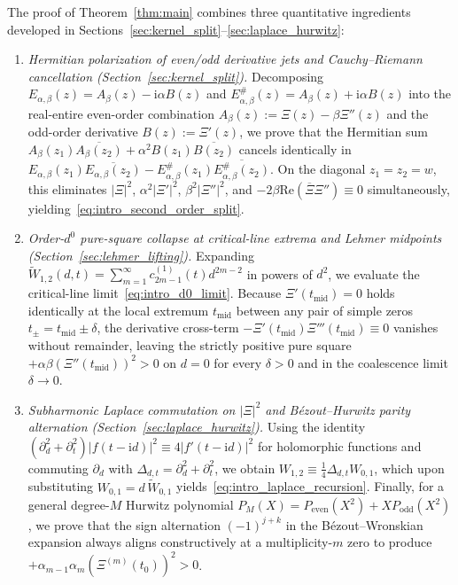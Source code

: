 \documentclass[11pt,reqno]{amsart}
\theoremstyle{definition}
\theoremstyle{remark}
\numberwithin{equation}{section}
\newcommand{\ii}{\mathrm{i}}
\newcommand{\Rea}{\mathrm{Re}}
\begin{document}
The proof of Theorem~\ref{thm:main} combines three quantitative ingredients developed in Sections~\ref{sec:kernel_split}--\ref{sec:laplace_hurwitz}:
\begin{enumerate}[label=\textup{(\arabic*)},leftmargin=2.2em]
\item \textit{Hermitian polarization of even/odd derivative jets and Cauchy--Riemann cancellation (Section~\ref{sec:kernel_split}).} Decomposing $E_{\alpha,\beta}(z) = A_\beta(z) - \ii\alpha B(z)$ and $E_{\alpha,\beta}^\#(z) = A_\beta(z) + \ii\alpha B(z)$ into the real-entire even-order combination $A_\beta(z) := \Xi(z) - \beta\Xi''(z)$ and the odd-order derivative $B(z) := \Xi'(z)$, we prove that the Hermitian sum $A_\beta(z_1)\overline{A_\beta(z_2)} + \alpha^2 B(z_1)\overline{B(z_2)}$ cancels identically in $E_{\alpha,\beta}(z_1)\overline{E_{\alpha,\beta}(z_2)} - E_{\alpha,\beta}^\#(z_1)\overline{E_{\alpha,\beta}^\#(z_2)}$. On the diagonal $z_1 = z_2 = w$, this eliminates $|\Xi|^2$, $\alpha^2|\Xi'|^2$, $\beta^2|\Xi''|^2$, and $-2\beta\Rea(\overline{\Xi}\Xi'') \equiv 0$ simultaneously, yielding~\eqref{eq:intro_second_order_split}.
\item \textit{Order-$d^0$ pure-square collapse at critical-line extrema and Lehmer midpoints (Section~\ref{sec:lehmer_lifting}).} Expanding $\widetilde{W}_{1,2}(d,t) = \sum_{m=1}^\infty c_{2m-1}^{(1)}(t)d^{2m-2}$ in powers of $d^2$, we evaluate the critical-line limit~\eqref{eq:intro_d0_limit}. Because $\Xi'(t_{\mathrm{mid}}) = 0$ holds identically at the local extremum $t_{\mathrm{mid}}$ between any pair of simple zeros $t_\pm = t_{\mathrm{mid}} \pm \delta$, the derivative cross-term $-\Xi'(t_{\mathrm{mid}})\Xi'''(t_{\mathrm{mid}}) \equiv 0$ vanishes without remainder, leaving the strictly positive pure square $+\alpha\beta(\Xi''(t_{\mathrm{mid}}))^2 > 0$ on $d = 0$ for every $\delta > 0$ and in the coalescence limit $\delta \to 0$.
\item \textit{Subharmonic Laplace commutation on $|\Xi|^2$ and Bézout--Hurwitz parity alternation (Section~\ref{sec:laplace_hurwitz}).} Using the identity $(\partial_d^2 + \partial_t^2)|f(t-\ii d)|^2 \equiv 4|f'(t-\ii d)|^2$ for holomorphic functions and commuting $\partial_d$ with $\Delta_{d,t} = \partial_d^2 + \partial_t^2$, we obtain $W_{1,2} \equiv \frac{1}{4}\Delta_{d,t}W_{0,1}$, which upon substituting $W_{0,1} = d\,\widetilde{W}_{0,1}$ yields~\eqref{eq:intro_laplace_recursion}. Finally, for a general degree-$M$ Hurwitz polynomial $P_M(X) = P_{\mathrm{even}}(X^2) + X P_{\mathrm{odd}}(X^2)$, we prove that the sign alternation $(-1)^{j+k}$ in the Bézout--Wronskian expansion always aligns constructively at a multiplicity-$m$ zero to produce $+\alpha_{m-1}\alpha_m(\Xi^{(m)}(t_0))^2 > 0$.
\end{enumerate}
\end{document}

